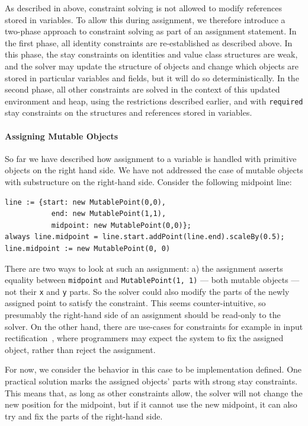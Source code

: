 As described in above, constraint solving is not allowed to modify
references stored in variables. To allow this during assignment, we
therefore introduce a two-phase approach to constraint solving as part
of an assignment statement.  In the first phase, all identity
constraints are re-established as described above. In this phase, the
stay constraints on identities and value class structures are weak,
and the solver may update the structure of objects and change which
objects are stored in particular variables and fields, but it will do
so deterministically.  In the second phase, all other constraints are
solved in the context of this updated environment and heap, using the
restrictions described earlier, and with \verb!required! stay
constraints on the structures and references stored in variables.

\paragraph*{Assigning Mutable Objects}
\label{sec:assign-mutable-objec}
So far we have described how assignment to a variable is handled with primitive
objects on the right hand side. We have not addressed the case of mutable
objects with substructure on the right-hand side. Consider the following
midpoint line:
\begin{lstlisting}
line := {start: new MutablePoint(0,0),
           end: new MutablePoint(1,1),
           midpoint: new MutablePoint(0,0)};
always line.midpoint = line.start.addPoint(line.end).scaleBy(0.5);
line.midpoint := new MutablePoint(0, 0)
\end{lstlisting}
There are two ways to look at such an assignment: a) the assignment asserts
equality between \lstinline{midpoint} and \lstinline{MutablePoint(1, 1)} ---
both mutable objects --- not their \lstinline{x} and \lstinline{y} parts. So the
solver could also modify the parts of the newly assigned point to satisfy the
constraint. This seems counter-intuitive, so presumably the right-hand side of
an assignment should be read-only to the solver. On the other hand, there are
use-cases for constraints for example in input rectification~\cite{long-rectification-2012}, where programmers may expect the system to fix
the assigned object, rather than reject the assignment.

For now, we consider the behavior in this case to be implementation defined. One
practical solution marks the assigned objects' parts with strong stay
constraints. This means that, as long as other constraints allow, the solver
will not change the new position for the midpoint, but if it cannot use the new
midpoint, it can also try and fix the parts of the right-hand side.

